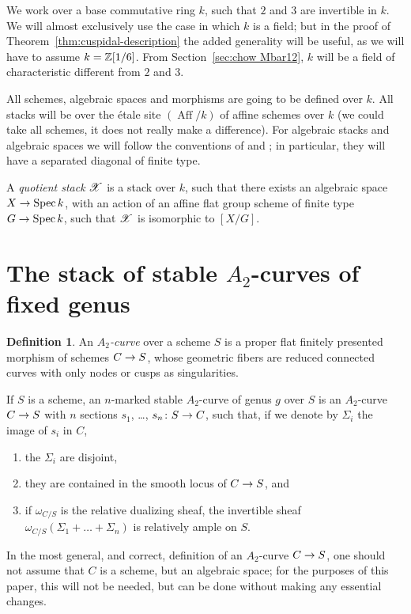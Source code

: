 \documentclass[a4paper, 10pt]{amsart}
\numberwithin{equation}{section}
\numberwithin{subsection}{section}
\newenvironment{enumerate1}
{\begin{enumerate}[\upshape (1)]}
	{\end{enumerate}}
\theoremstyle{definition}
\newtheorem{definition}[theorem]{Definition}
\theoremstyle{remark}
\newcommand\arr{\ifinner\to\else\longrightarrow\fi}
\newcommand\spec{\operatorname{Spec}}
\newcommand{\aff}[1][k]{(\operatorname{Aff}/#1)}
\begin{document}
	We work over a base commutative ring $k$, such that $2$ and $3$ are invertible in $k$. We will almost exclusively use the case in which $k$ is a field; but in the proof of Theorem~\ref{thm:cuspidal-description} the added generality will be useful, as we will have to assume $k = \mathbb{Z}[1/6]$. From Section~\ref{sec:chow Mbar12}, $k$ will be a field of characteristic different from $2$ and $3$.
	
	All schemes, algebraic spaces and morphisms are going to be defined over $k$. All stacks will be over the \'{e}tale site $\aff$ of affine schemes over $k$ (we could take all schemes, it does not really make a difference). For algebraic stacks and algebraic spaces we will follow the conventions of \cite{knutson} and \cite{laumon-moret-bailly}; in particular, they will have a separated diagonal of finite type.
	
	A \emph{quotient stack} $\mathscr{X}$ is a stack over $k$, such that there exists an algebraic space $X \arr \spec k$, with an action of an affine flat group scheme of finite type $G \arr \spec k$, such that $\mathscr{X}$ is isomorphic to $[X/G]$.
	
	\section{The stack of stable $A_2$-curves of fixed genus} \label{sec:cusp}
	
	\begin{definition}\label{def:A2 curves}
		An \emph{$A_2$-curve} over a scheme $S$  is a proper flat finitely presented morphism of schemes $C \arr S$, whose geometric fibers are reduced connected curves with only nodes or cusps as singularities.
		
		If $S$ is a scheme, an $n$-marked stable $A_2$-curve of genus $g$ over $S$ is an $A_{2}$-curve $C \arr S$ with $n$ sections $s_{1}$, \dots, $s_{n}\colon S \arr C$, such that, if we denote by $\Sigma_{i}$ the image of $s_{i}$ in $C$,
		\begin{enumerate1}
			
			\item the $\Sigma_{i}$ are disjoint,
			
			\item they are contained in the smooth locus of $C \arr S$, and
			
			\item if $\omega_{C/S}$ is the relative dualizing sheaf, the invertible sheaf $\omega_{C/S}(\Sigma_{1} +  \dots + \Sigma_{n})$ is relatively ample on $S$. 
			
		\end{enumerate1}
		
		In the most general, and correct, definition of an $A_2$-curve $C \arr S$, one should not assume that $C$ is a scheme, but an algebraic space; for the purposes of this paper, this will not be needed, but can be done without making any essential changes.
		
	\end{definition}
	
\end{document}

